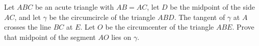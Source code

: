 Let $ABC$ be an acute triangle with $AB=AC$, let $D$ be the midpoint of the side $AC$,  and let $\gamma$ be the circumcircle of the triangle $ABD$. The tangent of $\gamma$ at $A$ crosses the line $BC$ at $E$. Let $O$ be the circumcenter of the triangle $ABE$. Prove that midpoint of the segment $AO$ lies on $\gamma$.

